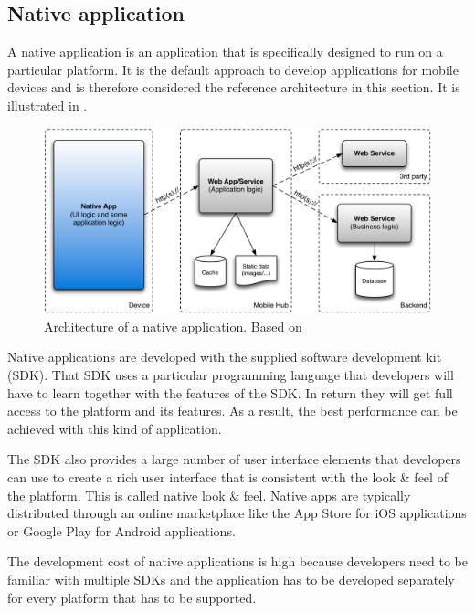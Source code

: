 \subsection{Native application}

A native application is an application that is specifically designed to run on a particular platform. It is the default approach to develop applications for mobile devices and is therefore considered the reference architecture in this section. It is illustrated in . 

\begin{figure}[h]
    \begin{center}
        \includegraphics[width=\textwidth]{figs/native.pdf}
        \caption{Architecture of a native application. Based on \cite{Friese}}
        \label{fig:native}
    \end{center}
\end{figure}

Native applications are developed with the supplied software development kit (SDK). That SDK uses a particular programming language that developers will have to learn together with the features of the SDK. In return they will get full access to the platform and its features. As a result, the best performance can be achieved with this kind of application.

The SDK also provides a large number of user interface elements that developers can use to create a rich user interface that is consistent with the look \& feel of the platform. This is called native look \& feel. Native apps are typically distributed through an online marketplace like the App Store for iOS applications or Google Play for Android applications. 

The development cost of native applications is high because developers need to be familiar with multiple SDKs and the application has to be developed separately for every platform that has to be supported.

